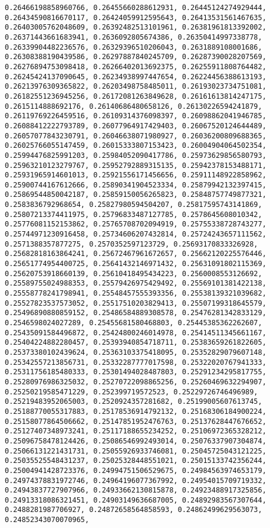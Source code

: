 \documentclass[11pt]{article}
\begin{document}
\begin{Verbatim}[commandchars=\\\{\}]
0.26466198858960766, 0.26455660288612931, 0.26445124274929444, 0.26434590816670117, 0.26424059912595643, 0.26413531561467635, 0.26403005762048609, 0.26392482513101961, 0.26381961813392002, 0.26371443661683941, 0.2636092805674386, 0.26350414997338778, 0.26339904482236576, 0.26329396510206043, 0.2631889108001686, 0.26308388190439586, 0.26297887840245709, 0.26287390028207569, 0.26276894753098418, 0.26266402013692375, 0.26255911808764482, 0.26245424137090645, 0.26234938997447654, 0.26224456388613193, 0.26213976309365822, 0.26203498758485011, 0.26193023734751081, 0.26182551236945256, 0.26172081263849628, 0.26161613814247175, 0.2615114888692176, 0.26140686480658126, 0.26130226594241879, 0.26119769226459516, 0.26109314376098397, 0.26098862041946785, 0.26088412222793789, 0.26077964917429403, 0.26067520124644489, 0.26057077843230791, 0.26046638071980927, 0.26036200809688365, 0.26025766055147459, 0.26015333807153423, 0.26004904064502354, 0.25994476825991203, 0.25984052090417786, 0.25973629856580793, 0.25963210123279767, 0.25952792889315135, 0.25942378153488171, 0.25931965914601013, 0.25921556171456656, 0.25911148922858962, 0.25900744167612666, 0.25890341904523334, 0.25879942132397415, 0.25869544850042187, 0.25859150056265823, 0.25848757749877321, 0.2583836792968654, 0.25827980594504207, 0.25817595743141869, 0.25807213374411975, 0.25796833487127785, 0.2578645608010342, 0.25776081152153862, 0.25765708702094919, 0.25755338728743277, 0.25744971230916458, 0.25734606207432814, 0.25724243657111562, 0.2571388357877275, 0.2570352597123729, 0.25693170833326928, 0.25682818163864241, 0.25672467961672657, 0.25662120225576446, 0.25651774954400725, 0.25641432146971432, 0.25631091802115369, 0.25620753918660139, 0.25610418495434223, 0.2560008553126692, 0.25589755024988353, 0.25579426975429492, 0.25569101381422138, 0.25558778241798941, 0.25548457555393356, 0.25538139321039682, 0.25527823537573052, 0.25517510203829413, 0.25507199318645579, 0.25496890880859152, 0.25486584889308578, 0.25476281342833129, 0.2546598024027289, 0.25455681580468803, 0.25445385362262607, 0.25435091584496872, 0.25424800246014978, 0.25414511345661167, 0.25404224882280457, 0.25393940854718711, 0.25383659261822605, 0.25373380102439624, 0.25363103375418095, 0.25352829079607148, 0.25342557213856731, 0.25332287777017598, 0.25322020767941333, 0.25311756185480333, 0.25301494028487803, 0.25291234295817755, 0.25280976986325032, 0.25270722098865256, 0.25260469632294907, 0.25250219585471229, 0.252399719572523, 0.25229726746496989, 0.25219483952065003, 0.2520924357281682, 0.25199005607613745, 0.25188770055317883, 0.25178536914792132, 0.25168306184900224, 0.25158077864506662, 0.25147851952476763, 0.25137628447676652, 0.25127407348973241, 0.25117188655234252, 0.25106972365328212, 0.25096758478124426, 0.25086546992493014, 0.25076337907304874, 0.25066131221431731, 0.25055926933746081, 0.25045725043121225, 0.25035525548431237, 0.25025328448551021, 0.25015133742356244, 0.25004941428723376, 0.24994751506529675, 0.24984563974653179, 0.24974378831972746, 0.24964196077367992, 0.24954015709719332, 0.24943837727907966, 0.24933662130815878, 0.24923488917325856, 0.24913318086321451, 0.24903149636687005, 0.24892983567307644, 0.2488281987706927, 0.24872658564858593, 0.24862499629563073, 0.24852343070070965, 
\end{Verbatim}
\end{document}
